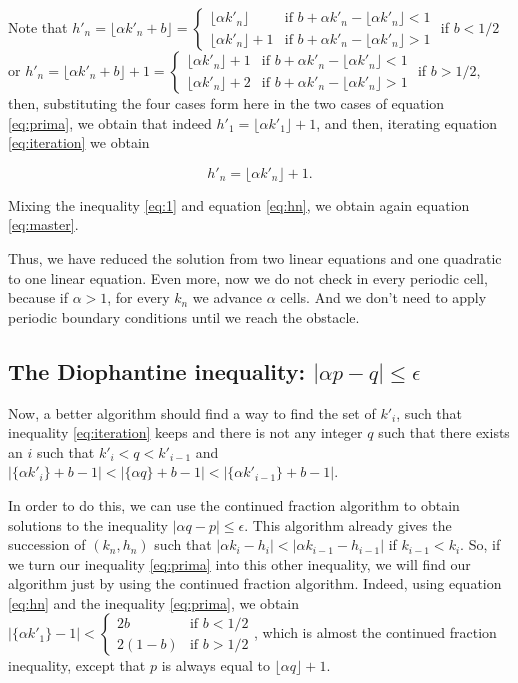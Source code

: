 \documentclass[prl,amsmath,amssymb, twocolumn, showpacs]{revtex4-1}
\begin{document}
Note that $h'_n= \lfloor \alpha k'_n +b  \rfloor= \begin{cases} \lfloor \alpha k'_n  \rfloor  &\mbox{if } b+\alpha k'_n-\lfloor \alpha k'_n  \rfloor < 1 \\ 
 \lfloor \alpha k'_n  \rfloor+1  &\mbox{if } b+\alpha k'_n-\lfloor \alpha k'_n  \rfloor > 1 \end{cases}$ if $b<1/2$ or $h'_n= \lfloor \alpha k'_n +b  \rfloor+1= \begin{cases} \lfloor \alpha k'_n  \rfloor+1  &\mbox{if } b+\alpha k'_n-\lfloor \alpha k'_n  \rfloor < 1 \\ 
 \lfloor \alpha k'_n  \rfloor+2  &\mbox{if } b+\alpha k'_n-\lfloor \alpha k'_n  \rfloor > 1 \end{cases}$ if $b>1/2$, then, substituting the four cases form here in the two cases of equation \ref{eq:prima}, we obtain that indeed $h'_1= \lfloor \alpha k'_1  \rfloor+1$, and then,  iterating  equation \ref{eq:iteration} we obtain 

\begin{equation}
 h'_n= \lfloor \alpha k'_n  \rfloor+1.
\label{eq:hn}
\end{equation}
 
Mixing the inequality \ref{eq:1} and equation \ref{eq:hn}, we obtain again equation \ref{eq:master}. 

Thus, we have reduced the solution from two linear equations and one quadratic to one linear equation. Even more, now we do not check in every periodic cell, because if $\alpha >1$, for every $k_n$ we advance $\alpha$ cells. And we don't need to apply periodic boundary conditions until we reach the obstacle. 

\subsection{The Diophantine inequality: $|\alpha p - q|\leq \epsilon$}

Now, a better algorithm should find a way to find the set of $k'_i$, such that inequality \ref{eq:iteration} keeps and there is not any integer $q$ such that there exists an $i$ such that $k'_i<q<k'_{i-1}$ and
$|\{ \alpha  k'_i \}+b -1|<|\{ \alpha  q \}+b -1| <|\{ \alpha  k'_{i-1} \}+b -1|$. 

In order to do this, we can use the continued fraction algorithm to obtain solutions to the inequality $|\alpha q - p|\leq \epsilon$. This algorithm already gives the succession of $(k_n,h_n)$ such that $|\alpha k_i - h_i|<|\alpha k_{i-1} - h_{i-1}|$ if $k_{i-1} <k_i$. So, if we turn our inequality \ref{eq:prima} into this other inequality, we will find our algorithm just by using the continued fraction algorithm.
Indeed, using equation \ref{eq:hn} and the inequality \ref{eq:prima}, we obtain $|\{ \alpha  k'_1 \} -1|< \begin{cases} 2b &\mbox{if } b < 1/2 \\  2(1-b) & \mbox{if } b > 1/2 \end{cases} $, which is almost the continued fraction inequality, except that $p$ is always equal to $\lfloor \alpha q  \rfloor+1$. 
\end{document}
